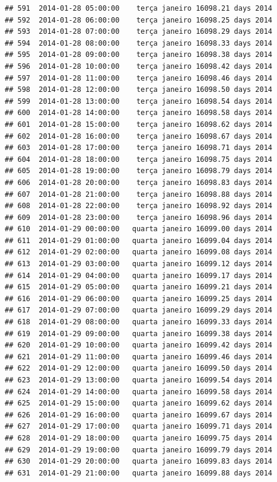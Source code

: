 \documentclass[]{book}
\begin{document}
\begin{verbatim}
## 591  2014-01-28 05:00:00    terça janeiro 16098.21 days 2014
## 592  2014-01-28 06:00:00    terça janeiro 16098.25 days 2014
## 593  2014-01-28 07:00:00    terça janeiro 16098.29 days 2014
## 594  2014-01-28 08:00:00    terça janeiro 16098.33 days 2014
## 595  2014-01-28 09:00:00    terça janeiro 16098.38 days 2014
## 596  2014-01-28 10:00:00    terça janeiro 16098.42 days 2014
## 597  2014-01-28 11:00:00    terça janeiro 16098.46 days 2014
## 598  2014-01-28 12:00:00    terça janeiro 16098.50 days 2014
## 599  2014-01-28 13:00:00    terça janeiro 16098.54 days 2014
## 600  2014-01-28 14:00:00    terça janeiro 16098.58 days 2014
## 601  2014-01-28 15:00:00    terça janeiro 16098.62 days 2014
## 602  2014-01-28 16:00:00    terça janeiro 16098.67 days 2014
## 603  2014-01-28 17:00:00    terça janeiro 16098.71 days 2014
## 604  2014-01-28 18:00:00    terça janeiro 16098.75 days 2014
## 605  2014-01-28 19:00:00    terça janeiro 16098.79 days 2014
## 606  2014-01-28 20:00:00    terça janeiro 16098.83 days 2014
## 607  2014-01-28 21:00:00    terça janeiro 16098.88 days 2014
## 608  2014-01-28 22:00:00    terça janeiro 16098.92 days 2014
## 609  2014-01-28 23:00:00    terça janeiro 16098.96 days 2014
## 610  2014-01-29 00:00:00   quarta janeiro 16099.00 days 2014
## 611  2014-01-29 01:00:00   quarta janeiro 16099.04 days 2014
## 612  2014-01-29 02:00:00   quarta janeiro 16099.08 days 2014
## 613  2014-01-29 03:00:00   quarta janeiro 16099.12 days 2014
## 614  2014-01-29 04:00:00   quarta janeiro 16099.17 days 2014
## 615  2014-01-29 05:00:00   quarta janeiro 16099.21 days 2014
## 616  2014-01-29 06:00:00   quarta janeiro 16099.25 days 2014
## 617  2014-01-29 07:00:00   quarta janeiro 16099.29 days 2014
## 618  2014-01-29 08:00:00   quarta janeiro 16099.33 days 2014
## 619  2014-01-29 09:00:00   quarta janeiro 16099.38 days 2014
## 620  2014-01-29 10:00:00   quarta janeiro 16099.42 days 2014
## 621  2014-01-29 11:00:00   quarta janeiro 16099.46 days 2014
## 622  2014-01-29 12:00:00   quarta janeiro 16099.50 days 2014
## 623  2014-01-29 13:00:00   quarta janeiro 16099.54 days 2014
## 624  2014-01-29 14:00:00   quarta janeiro 16099.58 days 2014
## 625  2014-01-29 15:00:00   quarta janeiro 16099.62 days 2014
## 626  2014-01-29 16:00:00   quarta janeiro 16099.67 days 2014
## 627  2014-01-29 17:00:00   quarta janeiro 16099.71 days 2014
## 628  2014-01-29 18:00:00   quarta janeiro 16099.75 days 2014
## 629  2014-01-29 19:00:00   quarta janeiro 16099.79 days 2014
## 630  2014-01-29 20:00:00   quarta janeiro 16099.83 days 2014
## 631  2014-01-29 21:00:00   quarta janeiro 16099.88 days 2014

\end{verbatim}
\end{document}
